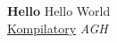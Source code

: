 \documentclass[12pt]{article}
\begin{document}
\textbf{Hello}
Hello World
\\
\underline{Kompilatory}
\textit{AGH}
\end{document}
